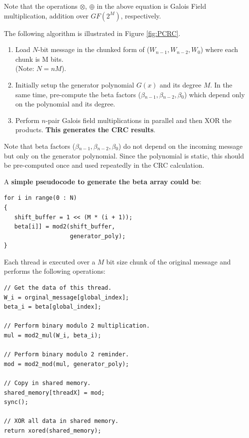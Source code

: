 \documentclass[fleqn]{IEEEtran}
\begin{document}
Note that the operations $\otimes{}$, $\oplus{}$ in the above equation is 
Galois Field multiplication, addition over $GF(2^{M})$, respectively.

The following algorithm is illustrated in Figure \ref{fig:PCRC}.
\begin{enumerate}
   \item Load $N$-bit message in the chunked form of ($W_{n-1},W_{n-2},W_{0}$)
   where each chunk is M bits. \\
   (Note: $N=nM$).

   \item Initially setup the generator polynomial $G(x)$ and its degree $M$. In
   the same time, pre-compute the beta factors 
   ($\beta{}_{n-1},\beta{}_{n-2},\beta{}_{0}$) which depend only on the 
   polynomial and its degree.

   \item Perform $n$-pair Galois field multiplications in
   parallel and then XOR the products. \textbf{This generates the CRC results}.
\end{enumerate}

Note that beta factors ($\beta{}_{n-1},\beta{}_{n-2},\beta{}_{0}$) 
do not depend on the incoming message but only on the generator polynomial. 
Since the polynomial is static, this should be pre-computed once and used 
repeatedly in the CRC calculation.

A \textbf{simple pseudocode to generate the beta array could be}:
\begin{verbatim}
for i in range(0 : N)
{
   shift_buffer = 1 << (M * (i + 1));
   beta[i]] = mod2(shift_buffer, 
                   generator_poly);
} 
\end{verbatim}

Each thread is executed over a $M$ bit size chunk of the original message and 
performs the following operations:
\begin{verbatim}
// Get the data of this thread.
W_i = orginal_message[global_index];
beta_i = beta[global_index];

// Perform binary modulo 2 multiplication.
mul = mod2_mul(W_i, beta_i);

// Perform binary modulo 2 reminder.
mod = mod2_mod(mul, generator_poly);

// Copy in shared memory.
shared_memory[threadX] = mod;
sync();

// XOR all data in shared memory.
return xored(shared_memory);
\end{verbatim}
\end{document}
